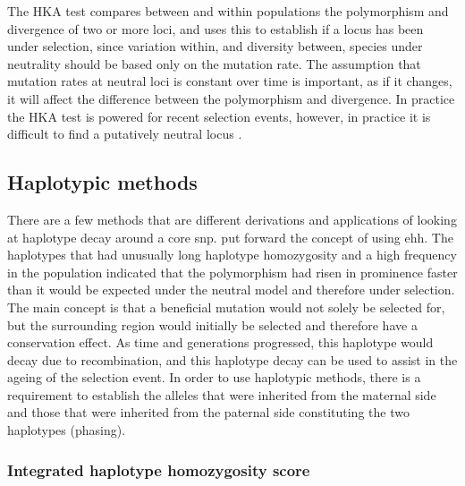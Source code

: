 \documentclass[]{report}
\begin{document}
The HKA test \citep{Hudson1987} compares between and within populations
the polymorphism and divergence of two or more loci, and uses this to
establish if a locus has been under selection, since variation within,
and diversity between, species under neutrality should be based only on
the mutation rate. The assumption that mutation rates at neutral loci is
constant over time is important, as if it changes, it will affect the
difference between the polymorphism and divergence. In practice the HKA
test is powered for recent selection events, however, in practice it is
difficult to find a putatively neutral locus \citep{Zhai2009}.

\subsection{Haplotypic methods}\label{haplotypic-methods}

There are a few methods that are different derivations and applications
of looking at haplotype decay around a core \gls{snp}.
\citet{sabeti2006positive} put forward the concept of using \gls{ehh}.
The haplotypes that had unusually long haplotype homozygosity and a high
frequency in the population indicated that the polymorphism had risen in
prominence faster than it would be expected under the neutral model and
therefore under selection. The main concept is that a beneficial
mutation would not solely be selected for, but the surrounding region
would initially be selected and therefore have a conservation effect. As
time and generations progressed, this haplotype would decay due to
recombination, and this haplotype decay can be used to assist in the
ageing of the selection event. In order to use haplotypic methods, there
is a requirement to establish the alleles that were inherited from the
maternal side and those that were inherited from the paternal side
constituting the two haplotypes (phasing).

\subsubsection{Integrated haplotype homozygosity
score}\label{integrated-haplotype-homozygosity-score}
\end{document}
